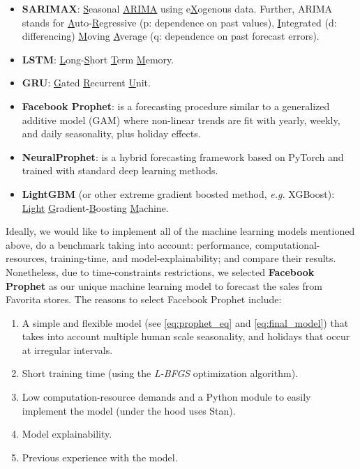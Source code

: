 \begin{itemize}
\item \textbf{SARIMAX}\autocite{hyndman2002state}: \underline{S}easonal \underline{ARIMA} using e\underline{X}ogenous data. Further, ARIMA stands for \underline{A}uto-\underline{R}egressive (p: dependence on past values), \underline{I}ntegrated (d: differencing) \underline{M}oving \underline{A}verage (q: dependence on past forecast errors). 
\item \textbf{LSTM}\autocite{hochreiter1997long}: \underline{L}ong-\underline{S}hort \underline{T}erm \underline{M}emory.
\item \textbf{GRU}\autocite{cho2014learning}: \underline{G}ated \underline{R}ecurrent \underline{U}nit.
\item \textbf{Facebook Prophet}\autocite{taylor2018forecasting}: is a forecasting procedure similar to a generalized additive model\autocite{hastie1987generalized} (GAM) where non-linear trends are fit with yearly, weekly, and daily seasonality, plus holiday effects.
\item \textbf{NeuralProphet}\autocite{triebe2021neuralprophet}: is a hybrid forecasting framework based on PyTorch and trained with standard deep learning methods.
\item \textbf{LightGBM}\autocite{ke2017lightgbm} (or other extreme gradient boosted method, \textit{e.g.} XGBoost): \underline{Light} \underline{G}radient-\underline{B}oosting \underline{M}achine.
\end{itemize}


Ideally, we would like to implement all of the  machine learning models mentioned above, do a benchmark taking into account: performance, computational-resources, training-time, and model-explainability; and compare their results. Nonetheless, due to time-constraints restrictions, we selected \textbf{Facebook Prophet} as our unique machine learning model to forecast the sales from Favorita stores. The reasons to select Facebook Prophet include:

\begin{enumerate}
\item A simple and flexible model (see \autoref{eq:prophet_eq} and  \autoref{eq:final_model}) that takes into account multiple human scale seasonality, and holidays that occur at irregular intervals.
\item Short training time (using the \textit{L-BFGS}  optimization algorithm\autocite{byrd1995limited}).
\item Low computation-resource demands and a Python module to easily implement the model (under the hood uses Stan\autocite{carpenter2017stan}).
\item Model explainability.
\item Previous experience with the model.
\end{enumerate} 

